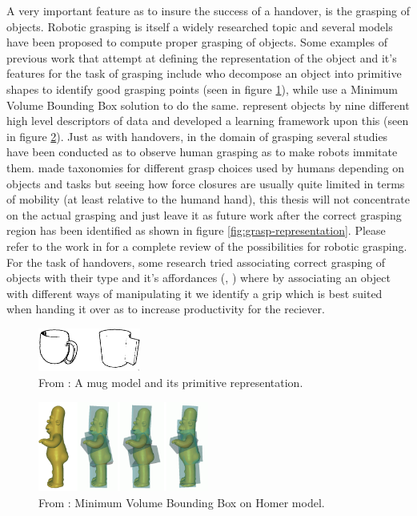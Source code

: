A very important feature as to insure the success of a handover, is the grasping of objects. Robotic grasping is itself a widely researched topic and several models have been proposed to compute proper grasping of objects. Some examples of previous work that attempt at defining the representation of the object and it's features for the task of grasping include \textcite{Miller2003} who decompose an object into primitive shapes to identify good grasping points (seen in figure \ref{fig:rel__shape-primitives}), while \textcite{Huebner2008} use a Minimum Volume Bounding Box solution to do the same. \textcite{Morales} represent objects by nine different high level descriptors of data and developed a learning framework upon this (seen in figure \ref{fig:rel__mvbb}). Just as with handovers, in the domain of grasping several studies have been conducted as to observe human grasping as to make robots immitate them. \parencite{Cutkosky1990} \parencite{Feix2009} \parencite{Kang1993} made taxonomies for different grasp choices used by humans depending on objects and tasks but seeing how force closures are usually quite limited in terms of mobility (at least relative to the humand hand), this thesis will not concentrate on the actual grasping and just leave it as future work after the correct grasping region has been identified as shown in figure \ref{fig:grasp-representation}. Please refer to the work in \parencite{Sahbani2012} for a complete review of the possibilities for robotic grasping. For the task of handovers, some research tried associating correct grasping of objects with their type and it's affordances (\parencite{Song2015}, \parencite{Chan2014}) where by associating an object with different ways of manipulating it we identify a grip which is best suited when handing it over as to increase productivity for the reciever.

\begin{figure}
	\centering
	\includegraphics[width=0.3\textwidth]{img/related-work/shape-primitives.png}
	\caption{From \parencite{Miller2003}: A mug model and its primitive representation.}
	\label{fig:rel__shape-primitives}
\end{figure}

\begin{figure}
	\centering
	\includegraphics[width=0.5\textwidth]{img/related-work/mvbb.png}
	\caption{From \parencite{Huebner2008}: Minimum Volume Bounding Box on Homer model.}
	\label{fig:rel__mvbb}
\end{figure}

